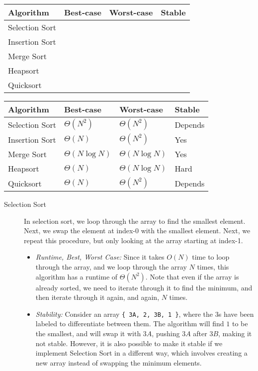 \ifprintanswers\else
{
\renewcommand{\arraystretch}{2}
\setlength{\tabcolsep}{12pt}
\begin{tabularx}{\textwidth}{Xlll}
Algorithm         & Best-case & Worst-case & Stable \\\hline
Selection Sort    &           &            &        \\
Insertion Sort    &           &            &        \\
Merge Sort        &           &            &        \\
Heapsort          &           &            &        \\
Quicksort         &           &            &
\end{tabularx}
}
\fi

\begin{solution}
{
\renewcommand{\arraystretch}{2}
\setlength{\tabcolsep}{12pt}
\begin{tabularx}{\textwidth}{Xlll}
Algorithm         & Best-case          & Worst-case          & Stable \\\hline
Selection Sort    & $\Theta(N^2)$      & $\Theta(N^2)$       & Depends\\
Insertion Sort    & $\Theta(N)$        & $\Theta(N^2)$       & Yes    \\
Merge Sort        & $\Theta(N \log N)$ & $\Theta(N \log N)$  & Yes    \\
Heapsort          & $\Theta(N)$        & $\Theta(N \log N)$  & Hard	  \\
Quicksort         & $\Theta(N)$        & $\Theta(N^2)$       & Depends
\end{tabularx}
}

\begin{description}
\item[Selection Sort]
In selection sort, we loop through the array to find the smallest element.
Next, we swap the element at index-0 with the smallest element. Next, we repeat
this procedure, but only looking at the array starting at index-1.

\begin{itemize}
\item \textit{Runtime, Best, Worst Case:} Since it takes $O(N)$ time to loop
through the array, and we loop through the array $N$ times, this algorithm has
a runtime of $\Theta(N^2)$. Note that even if the array is already sorted, we
need to iterate through it to find the minimum, and then iterate through it
again, and again, $N$ times.
\item \textit{Stability:} Consider an array \lstinline${ 3A, 2, 3B, 1 }$, where
the $3$s have been labeled to differentiate between them. The algorithm will
find $1$ to be the smallest, and will swap it with $3A$, pushing $3A$ after
$3B$, making it not stable. However, it is also possible to make it stable if
we implement Selection Sort in a different way, which involves creating a new
array instead of swapping the minimum elements.
\end{itemize}


\end{description}
\end{solution}
